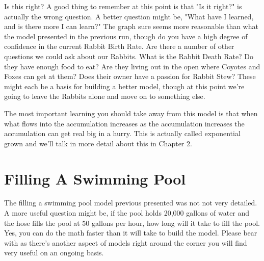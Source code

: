\documentclass[]{memoir}
\begin{document}
\begin{oframed}
\begin{enumerate}
Is this right? A good thing to remember at this point is that "Is it right?" is actually the wrong question. A better question might be, "What have I learned, and is there more I can learn?" The graph sure seems more reasonable than what the model presented in the previous run, though do you have a high degree of confidence in the current Rabbit Birth Rate. Are there a number of other questions we could ask about our Rabbits. What is the Rabbit Death Rate? Do they have enough food to eat? Are they living out in the open where Coyotes and Foxes can get at them? Does their owner have a passion for Rabbit Stew? These might each be a basis for building a better model, though at this point we're going to leave the Rabbits alone and move on to something else.



\end{enumerate} \end{oframed}

The most important learning you should take away from this model is that
when what flows into the accumulation increases as the accumulation
increases the accumulation can get real big in a hurry. This is actually
called exponential grown and we'll talk in more detail about this in
Chapter 2.

\section{Filling A Swimming Pool}

The filling a swimming pool model previous presented was not not very
detailed. A more useful question might be, if the pool holds 20,000
gallons of water and the hose fills the pool at 50 gallons per hour, how
long will it take to fill the pool. Yes, you can do the math faster than
it will take to build the model. Please bear with as there's another
aspect of models right around the corner you will find very useful on an
ongoing basis.

\FloatBarrier 
\end{document}
